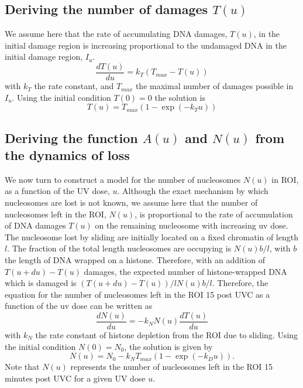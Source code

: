 \documentclass[12pt]{article}
\begin{document}
\subsection{Deriving the number of damages $T(u)$}
We assume here that the rate of accumulating DNA damages, $T(u)$, in the initial damage region is increasing proportional to the undamaged DNA in the initial damage region, $I_u$.
\begin{equation}
\frac{dT(u)}{du}=k_T\left(T_{max}-T(u)\right)
\end{equation}
with $k_T$ the rate constant, and $T_{max}$ the maximal number of damages possible in $I_u$. 
Using the initial condition $T(0) = 0$ the solution is
\begin{equation}
T(u) = T_{max}\left(1-\exp(-k_T u)\right) 
\end{equation}

\subsection{Deriving the function $A(u)$ and $N(u)$ from the dynamics of loss}
We now turn to construct a model for the number of nucleosomes $N(u)$ in ROI, as a function of the UV dose, $u$. Although the exact mechanism by which nucleosomes are lost is not known, we assume here that the number of nucleosomes left in the ROI, $N(u)$, is proportional to the rate of accumulation of DNA damages $T(u)$ on the remaining nucleosome with increasing uv dose. The nucleosome lost by sliding are initially located on a fixed chromatin of length $l$. The fraction of the total length nucleosomes are occupying is $N(u)b/l$, with $b$ the length of DNA wrapped on a histone. Therefore, with an addition of $T(u+du)-T(u)$ damages, the expected number of histone-wrapped DNA which is damaged is $(T(u+du)-T(u))/l  N(u)b/l $. Therefore, the equation for the number of nucleosomes left in the ROI 15 post UVC as a function of the uv dose can be written as
\begin{equation*}
\frac{dN(u)}{du} = -k_NN(u)\frac{dT(u)}{du}
\end{equation*}
with $k_N$ the rate constant of histone depletion from the ROI due to sliding. Using the initial condition $N(0) = N_0$, the solution is given by
\begin{equation}\label{eq:NumHistones}
N(u) = N_0-k_NT_{max}\left(1-\exp(-k_Du)\right).
\end{equation}
Note that $N(u)$ represents the number of nucleosomes left in the ROI 15 minutes post UVC for a given UV dose $u$.
\end{document}
